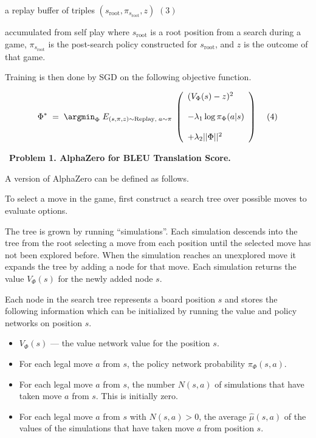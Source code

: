\documentclass{article}
\begin{document}
\medskip
\centerline{a replay buffer of triples $(s_{\mathrm{root}},\pi_{s_{\mathrm{root}}},z)$ \hspace{2em}$(3)$}

\medskip
accumulated from self play where $s_{\mathrm{root}}$ is a root position from a search during a game,
$\pi_{s_{\mathrm{root}}}$ is the post-search policy constructed for $s_{\mathrm{root}}$, and $z$ is the outcome of that game.

\medskip
Training is then done by SGD on the following objective function.

$$\Phi^*\; = \;\argmin_\Phi \;E_{(s,\pi,z) \sim \mathrm{Replay},\;a \sim \pi}\;\left(\begin{array}{l} (V_\Phi(s) - z)^2 \\ \\ - \lambda_1\log \pi_\Phi(a|s) \\ \\ + \lambda_2||\Phi||^2\end{array}\right)\;\;\;\;(4)$$

  
~{\bf Problem 1. AlphaZero for BLEU Translation Score.}

A version of AlphaZero can be defined as follows.

\medskip
To select a move in the game, first construct a search tree over possible moves to evaluate options.

\medskip
The tree is grown by running ``simulations''.  Each simulation descends into the tree from the root selecting a move from each position
until the selected move has not been explored before.  When the simulation reaches an unexplored move it expands the tree by adding a node for that move.
Each simulation returns the value $V_\Phi(s)$ for the newly added node $s$.

\medskip
Each node in the search tree represents a board position $s$ and stores the following information which can be initialized
by running the value and policy networks on position $s$.

\begin{itemize}
\item $V_\Phi(s)$ --- the value network value for the position $s$.
\item For each legal move $a$ from $s$, the policy network probability $\pi_\Phi(s,a)$.
\item For each legal move $a$ from $s$, the number $N(s,a)$ of simulations that have taken move $a$ from $s$. This is initially zero.
\item For each legal move $a$ from $s$ with $N(s,a) > 0$, the average $\hat{\mu}(s,a)$ of the values of the simulations that have
  taken move $a$ from position $s$.
\end{itemize}
\end{document}

